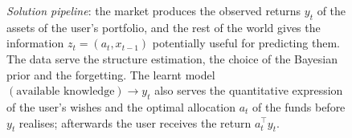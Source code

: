 \begin{figure}[!ht]
{}
   \caption{\emph{Solution pipeline}: the market produces the observed returns $y_{t}$ of the assets of the user's portfolio, and the rest of the world gives the information $z_{t}=(a_{t},x_{t-1})$ potentially useful for predicting them. The data serve the structure estimation, the choice of the Bayesian prior and the forgetting. The learnt model $(\mbox{available knowledge})\rightarrow y_{t}$ also serves the quantitative expression of the user's wishes and the optimal allocation $a_{t}$ of the funds before $y_{t}$ realises; afterwards the user receives the return $a_{t}^{\top}y_{t}$.}
    \label{fig:pipelinetikz}
\end{figure} 